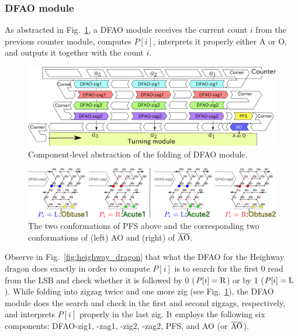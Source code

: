 			\subsubsection{DFAO module}


As abstracted in Fig.~\ref{fig:abst_dfao}, a DFAO module receives the current count $i$ from the previous counter module, computes $P[i]$, interprets it properly either A or O, and outputs it together with the count $i$. 

\begin{figure}[h]
\includegraphics[width=\linewidth]{pic/abst_DFAO.png}
\caption{Component-level abstraction of the folding of DFAO module.}
\label{fig:abst_dfao}
\end{figure}


\begin{figure}[h]
\includegraphics[width=\linewidth]{pic/PFS.png}
\caption{The two conformations of PFS above and the corresponding two conformations of (left) AO and (right) of $\overline{\rm AO}$.}
\label{fig:PFS}
\end{figure}

Observe in Fig.~\ref{fig:heighway_dragon} that what the DFAO for the Heighway dragon does exactly in order to compute $P[i]$ is to search for the first 0 read from the LSB and check whether it is followed by 0 ($P[i] = {\rm R}$) or by 1 ($P[i] = {\rm L}$). 
While folding into zigzag twice and one more zig (see Fig.~\ref{fig:abst_dfao}), the DFAO module does the search and check in the first and second zigzags, respectively, and interprets $P[i]$ properly in the last zig. 
It employs the following six components: DFAO-zig1, -zag1, -zig2, -zag2, PFS, and AO (or $\overline{\rm AO}$). 

